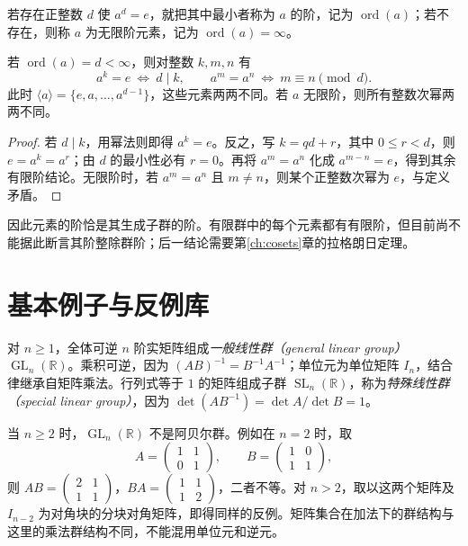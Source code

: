 \begin{definition}[元素的阶]
若存在正整数 $d$ 使 $a^d=e$，就把其中最小者称为 $a$ 的阶，记为 $\operatorname{ord}(a)$；若不存在，则称 $a$ 为无限阶元素，记为 $\operatorname{ord}(a)=\infty$。
\end{definition}

\begin{proposition}[幂相等的判别]\label{prop:order-divisibility}
若 $\operatorname{ord}(a)=d<\infty$，则对整数 $k,m,n$ 有
\[
  a^k=e\ \Longleftrightarrow\ d\mid k,\qquad
  a^m=a^n\ \Longleftrightarrow\ m\equiv n\pmod d.
\]
此时 $\langle a\rangle=\{e,a,\ldots,a^{d-1}\}$，这些元素两两不同。若 $a$ 无限阶，则所有整数次幂两两不同。
\end{proposition}
\begin{proof}
若 $d\mid k$，用幂法则即得 $a^k=e$。反之，写 $k=qd+r$，其中 $0\leq r<d$，则 $e=a^k=a^r$；由 $d$ 的最小性必有 $r=0$。再将 $a^m=a^n$ 化成 $a^{m-n}=e$，得到其余有限阶结论。无限阶时，若 $a^m=a^n$ 且 $m\ne n$，则某个正整数次幂为 $e$，与定义矛盾。
\end{proof}

因此元素的阶恰是其生成子群的阶。有限群中的每个元素都有有限阶，但目前尚不能据此断言其阶整除群阶；后一结论需要第\ref{ch:cosets}章的拉格朗日定理。

\section{基本例子与反例库}\label{sec:basic-group-examples}

\begin{example}[矩阵群]
对 $n\geq1$，全体可逆 $n$ 阶实矩阵组成\emph{一般线性群（general linear group）}$\operatorname{GL}_n(\mathbb R)$。乘积可逆，因为 $(AB)^{-1}=B^{-1}A^{-1}$；单位元为单位矩阵 $I_n$，结合律继承自矩阵乘法。行列式等于 $1$ 的矩阵组成子群 $\operatorname{SL}_n(\mathbb R)$，称为\emph{特殊线性群（special linear group）}，因为 $\det(AB^{-1})=\det A/\det B=1$。
\end{example}

当 $n\geq2$ 时，$\operatorname{GL}_n(\mathbb R)$ 不是阿贝尔群。例如在 $n=2$ 时，取
\[
  A=\begin{pmatrix}1&1\\0&1\end{pmatrix},\qquad
  B=\begin{pmatrix}1&0\\1&1\end{pmatrix},
\]
则 $AB=\left(\begin{smallmatrix}2&1\\1&1\end{smallmatrix}\right)$，$BA=\left(\begin{smallmatrix}1&1\\1&2\end{smallmatrix}\right)$，二者不等。对 $n>2$，取以这两个矩阵及 $I_{n-2}$ 为对角块的分块对角矩阵，即得同样的反例。矩阵集合在加法下的群结构与这里的乘法群结构不同，不能混用单位元和逆元。

